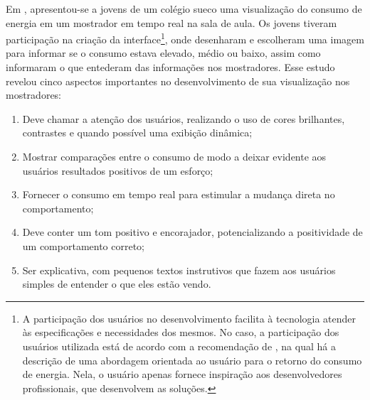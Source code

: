Em \cite{2012_visualisation_sweden}, apresentou-se a jovens de um colégio sueco
uma visualização do consumo de energia em um mostrador em tempo real na sala de 
aula. Os jovens tiveram participação na criação da interface\footnote{A
participação dos usuários no desenvolvimento facilita à tecnologia atender às
especificações e necessidades dos mesmos. No caso, a participação dos usuários
utilizada está de acordo com a recomendação de
\cite{2009_extreme_user_filandia}, na qual há a descrição
de uma abordagem orientada ao usuário para o retorno do consumo de energia. Nela, o usuário apenas fornece
inspiração aos desenvolvedores profissionais, que desenvolvem as soluções.}, 
onde desenharam e escolheram uma imagem para informar se o consumo estava elevado, 
médio ou baixo, assim como informaram o que entederam das informações nos mostradores.
Esse estudo revelou cinco aspectos importantes no desenvolvimento de sua
visualização nos mostradores:

\begin{enumerate}
\item Deve chamar a atenção dos usuários, realizando o uso de cores brilhantes,
contrastes e quando possível uma exibição dinâmica; 
\item Mostrar comparações entre o consumo de modo a deixar evidente aos usuários
resultados positivos de um esforço;
\item Fornecer o consumo em tempo real para estimular a mudança direta no
comportamento;
\item Deve conter um tom positivo e encorajador, potencializando a positividade
de um comportamento correto;
\item Ser explicativa, com pequenos textos instrutivos que fazem aos usuários
simples de entender o que eles estão vendo.
\end{enumerate}

